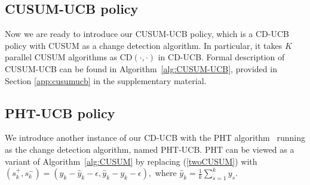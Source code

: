 \documentclass[letterpaper]{article} %
\newcommand{\blue}{}
\begin{document}
\subsection{CUSUM-UCB policy}

Now we are ready to introduce our CUSUM-UCB policy, which is a CD-UCB policy with CUSUM as a change detection algorithm. In particular, it takes $K$ parallel CUSUM algorithms as CD$(\cdot,\cdot)$ in CD-UCB. Formal description of CUSUM-UCB can be found in Algorithm~\ref{alg:CUSUM-UCB}, provided in Section \ref{app:cusumucb} in the supplementary material. %

\subsection{PHT-UCB policy}
We introduce another instance of our CD-UCB with the PHT algorithm~\cite{hinkley1971inference} running as the change detection algorithm, named PHT-UCB. PHT can be viewed as a variant of Algorithm~\ref{alg:CUSUM} by replacing (\ref{twoCUSUM}) with $(s_{k}^+,s_{k}^-)=(y_k-\hat{y}_k-\epsilon,\hat{y}_k-y_k-\epsilon),$
where $\hat{y}_k=\frac{1}{k}\sum_{s=1}^ky_s$. 
\end{document}
